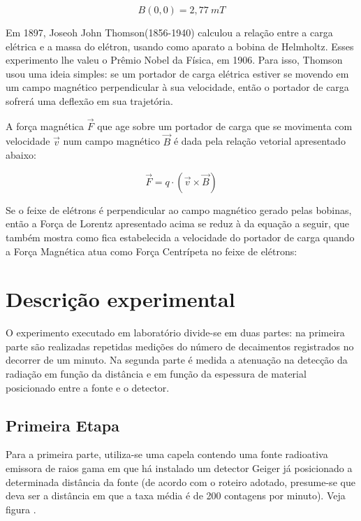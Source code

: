\documentclass{article}
\begin{document}
\begin{equation}
    B(0,0) = 2,77 \ mT
\end{equation}

Em 1897, Joseoh John Thomson(1856-1940) calculou a relação entre a carga elétrica e a massa do elétron, usando como aparato a bobina de Helmholtz. Esses experimento lhe valeu o Prêmio Nobel da Física, em 1906. Para isso, Thomson usou uma ideia simples: se um portador de carga elétrica estiver se movendo em um campo magnético perpendicular à sua velocidade, então o portador de carga sofrerá uma deflexão em sua trajetória.

A força magnética $\vec F$  que age sobre um portador de carga que se movimenta com velocidade $\vec v$ num campo magnético $\vec B$ é dada pela relação vetorial apresentado abaixo:

\begin{equation}
    \vec F  = q \cdot ( \vec v \times \vec B)
\end{equation}

Se o feixe de elétrons é perpendicular ao campo magnético gerado pelas bobinas, então a Força de Lorentz apresentado acima se reduz à da equação a seguir, que também mostra como fica estabelecida a velocidade do portador de carga quando a Força Magnética atua como Força Centrípeta no feixe de elétrons:

\section{Descrição experimental}


O experimento executado em laboratório divide-se em duas partes: na primeira parte são realizadas repetidas medições do número de decaimentos registrados no decorrer de um minuto. Na segunda parte é medida a atenuação na detecção da radiação em função da distância e em função da espessura de material posicionado entre a fonte e o detector.

\subsection{Primeira Etapa}

Para a primeira parte, utiliza-se uma capela contendo uma fonte radioativa emissora de raios gama em que há instalado um detector Geiger já posicionado a determinada distância da fonte (de acordo com o roteiro adotado, presume-se que deva ser a distância em que a taxa média é de 200 contagens por minuto). Veja figura .
\end{document}
